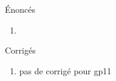 

Énoncés
\begin{enumerate}
  \item 
\end{enumerate}

Corrigés
\begin{enumerate}
  \item pas de corrigé pour gp11
\end{enumerate}


